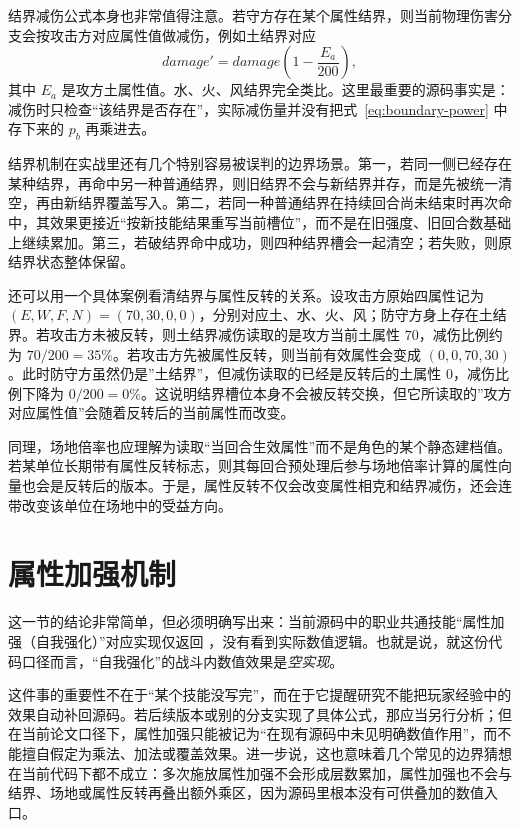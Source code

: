 结界减伤公式本身也非常值得注意。若守方存在某个属性结界，则当前物理伤害分支会按攻击方对应属性值做减伤，例如土结界对应
\begin{equation}
    damage' = damage\left(1-\frac{E_a}{200}\right),
\end{equation}
其中 $E_a$ 是攻方土属性值。水、火、风结界完全类比。这里最重要的源码事实是：减伤时只检查“该结界是否存在”，实际减伤量并没有把式~\eqref{eq:boundary-power} 中存下来的 $p_b$ 再乘进去。

结界机制在实战里还有几个特别容易被误判的边界场景。第一，若同一侧已经存在某种结界，再命中另一种普通结界，则旧结界不会与新结界并存，而是先被统一清空，再由新结界覆盖写入。第二，若同一种普通结界在持续回合尚未结束时再次命中，其效果更接近“按新技能结果重写当前槽位”，而不是在旧强度、旧回合数基础上继续累加。第三，若破结界命中成功，则四种结界槽会一起清空；若失败，则原结界状态整体保留。

还可以用一个具体案例看清结界与属性反转的关系。设攻击方原始四属性记为 $(E,W,F,N)=(70,30,0,0)$，分别对应土、水、火、风；防守方身上存在土结界。若攻击方未被反转，则土结界减伤读取的是攻方当前土属性 $70$，减伤比例约为 $70/200=35\%$。若攻击方先被属性反转，则当前有效属性会变成 $(0,0,70,30)$。此时防守方虽然仍是”土结界”，但减伤读取的已经是反转后的土属性 $0$，减伤比例下降为 $0/200=0\%$。这说明结界槽位本身不会被反转交换，但它所读取的”攻方对应属性值”会随着反转后的当前属性而改变。

同理，场地倍率也应理解为读取“当回合生效属性”而不是角色的某个静态建档值。若某单位长期带有属性反转标志，则其每回合预处理后参与场地倍率计算的属性向量也会是反转后的版本。于是，属性反转不仅会改变属性相克和结界减伤，还会连带改变该单位在场地中的受益方向。

\section{属性加强机制}

这一节的结论非常简单，但必须明确写出来：当前源码中的职业共通技能“属性加强（自我强化）”对应实现仅返回 ，没有看到实际数值逻辑。也就是说，就这份代码口径而言，“自我强化”的战斗内数值效果是\emph{空实现}。

这件事的重要性不在于“某个技能没写完”，而在于它提醒研究不能把玩家经验中的效果自动补回源码。若后续版本或别的分支实现了具体公式，那应当另行分析；但在当前论文口径下，属性加强只能被记为“在现有源码中未见明确数值作用”，而不能擅自假定为乘法、加法或覆盖效果。进一步说，这也意味着几个常见的边界猜想在当前代码下都不成立：多次施放属性加强不会形成层数累加，属性加强也不会与结界、场地或属性反转再叠出额外乘区，因为源码里根本没有可供叠加的数值入口。


